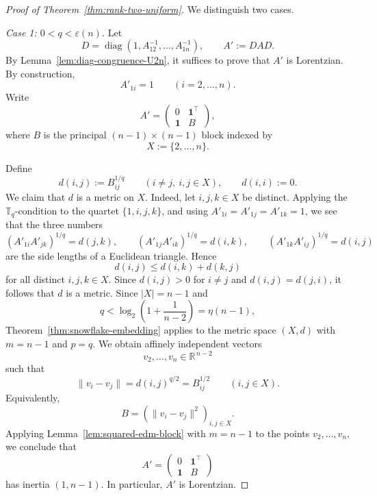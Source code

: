 \documentclass[12pt]{amsart}
\theoremstyle{definition}
\newcommand{\1}{\mathbf{1}}
\newcommand{\diag}{\operatorname{diag}}
\newcommand\R{{\mathbb R}}
\newcommand\T{{\mathbb T}}
\begin{document}
\begin{proof}[Proof of Theorem~\ref{thm:rank-two-uniform}]
We  distinguish two cases.

\smallskip

\noindent\emph{Case 1: $0<q<\varepsilon(n)$.}
Let
\[
D=\diag(1,A_{12}^{-1},\dots,A_{1n}^{-1}),
\qquad
A':=DAD.
\]
By Lemma~\ref{lem:diag-congruence-U2n}, it suffices to prove that $A'$ is Lorentzian.
By construction,
\[
A'_{1i}=1 \qquad (i=2,\dots,n).
\]
Write
\[
A'=
\begin{pmatrix}
0 & \mathbf{1}^\top\\
\mathbf{1} & B
\end{pmatrix},
\]
where $B$ is the principal $(n-1)\times (n-1)$ block indexed by
\[
X:=\{2,\dots,n\}.
\]

Define
\[
d(i,j):=B_{ij}^{1/q}\qquad (i\neq j,\ i,j\in X),
\qquad
d(i,i):=0.
\]
We claim that $d$ is a metric on $X$. Indeed, let $i,j,k\in X$ be distinct.
Applying the $\T_q$-condition to the quartet $\{1,i,j,k\}$, and using
$A'_{1i}=A'_{1j}=A'_{1k}=1$, we see that the three numbers
\[
(A'_{1i}A'_{jk})^{1/q}=d(j,k),\qquad
(A'_{1j}A'_{ik})^{1/q}=d(i,k),\qquad
(A'_{1k}A'_{ij})^{1/q}=d(i,j)
\]
are the side lengths of a Euclidean triangle. Hence
\[
d(i,j)\le d(i,k)+d(k,j)
\]
for all distinct $i,j,k\in X$. Since $d(i,j)>0$ for $i\neq j$ and
$d(i,j)=d(j,i)$, it follows that $d$ is a metric.
Since $|X|=n-1$ and
\[
q<\log_2\!\left(1+\frac{1}{n-2}\right)=\eta(n-1),
\]
Theorem~\ref{thm:snowflake-embedding} applies to the metric space $(X,d)$
with $m=n-1$ and $p=q$. We obtain affinely independent vectors
\[
v_2,\dots,v_n\in \R^{\,n-2}
\]
such that
\[
\|v_i-v_j\|
=
d(i,j)^{q/2}
=
B_{ij}^{1/2}
\qquad (i,j\in X).
\]
Equivalently,
\[
B=(\|v_i-v_j\|^2)_{i,j\in X}.
\]
Applying Lemma~\ref{lem:squared-edm-block} with $m=n-1$ to the points
$v_2,\dots,v_n$, we conclude that
\[
A'=
\begin{pmatrix}
0 & \mathbf{1}^\top\\
\mathbf{1} & B
\end{pmatrix}
\]
has inertia $(1,n-1)$. In particular, $A'$ is Lorentzian.


\end{proof}
\end{document}
